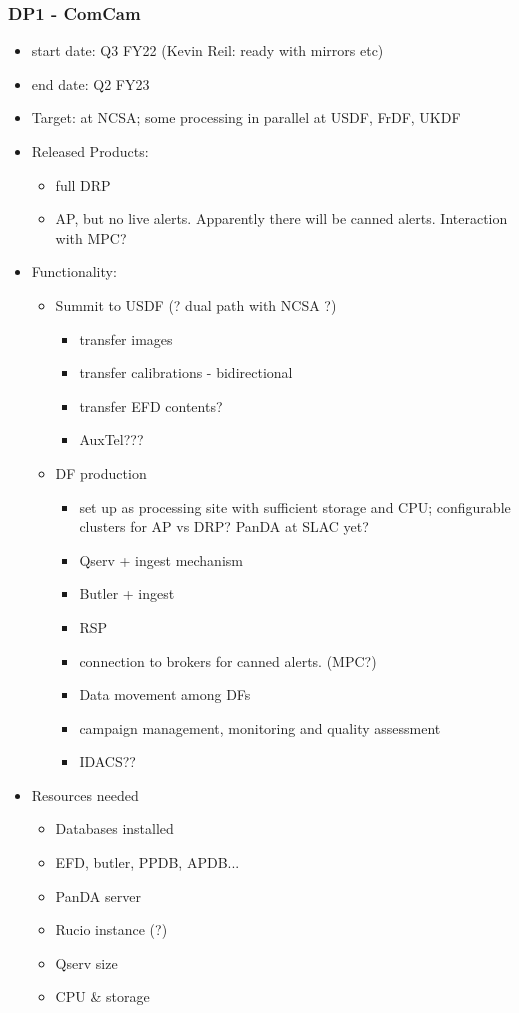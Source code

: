 \subsubsection{ \gls{DP1} - ComCam}
\begin{itemize}
\item start date: Q3 FY22 (Kevin Reil: ready with mirrors etc)
\item end date: Q2 FY23
\item Target: at NCSA; some processing in parallel at \gls{USDF}, FrDF, UKDF
\item Released Products:
\begin{itemize}
\item full \gls{DRP}
\item \gls{AP}, but no live alerts. Apparently there will be canned alerts. Interaction with MPC?
\end{itemize}
\item Functionality:
\begin{itemize}
\item Summit to \gls{USDF} (? dual path with NCSA ?)
\begin{itemize}
\item transfer images
\item transfer calibrations - bidirectional
\item transfer \gls{EFD} contents?
\item \gls{AuxTel}???
\end{itemize}
\item \gls{DF} production
\begin{itemize}
\item set up as processing site with sufficient storage and \gls{CPU}; configurable clusters for AP vs DRP? PanDA at SLAC yet?
\item \gls{Qserv} + ingest mechanism
\item \gls{Butler} + ingest
\item \gls{RSP}
\item connection to brokers for canned alerts. (\gls{MPC}?)
\item Data movement among DFs
\item campaign management, \gls{monitoring} and quality assessment
\item IDACS??
\end{itemize}
\end{itemize}
\item Resources needed
\begin{itemize}
\item Databases installed
\item \gls{EFD}, butler, PPDB, APDB...
\item \gls{PanDA} server
\item Rucio instance (?)
\item \gls{Qserv} size
\item \gls{CPU} \& storage
\end{itemize}
\end{itemize}

